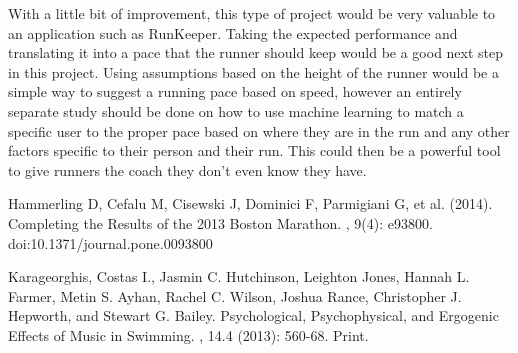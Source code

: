 \documentclass[twoside]{article}
\begin{document}
\begin{multicols}{2}
	With a little bit of improvement, this type of project would be very valuable to an application such as RunKeeper. Taking the expected performance and translating it into a pace that the runner should keep would be a good next step in this project. Using assumptions based on the height of the runner would be a simple way to suggest a running pace based on speed, however an entirely separate study should be done on how to use machine learning to match a specific user to the proper pace based on where they are in the run and any other factors specific to their person and their run. This could then be a powerful tool to give runners the coach they don't even know they have. 


\begin{thebibliography}{99} %


Hammerling D, Cefalu M, Cisewski J, Dominici F, Parmigiani G, et al. (2014).
\newblock Completing the Results of the 2013 Boston Marathon. 
, 9(4): e93800. doi:10.1371/journal.pone.0093800

Karageorghis, Costas I., Jasmin C. Hutchinson, Leighton Jones, Hannah L. Farmer, Metin S. Ayhan, Rachel C. Wilson, Joshua Rance, Christopher J. Hepworth, and Stewart G. Bailey. 
\newblock Psychological, Psychophysical, and Ergogenic Effects of Music in Swimming. 
, 14.4 (2013): 560-68. Print.
 
\end{thebibliography}


\end{multicols}
\end{document}
